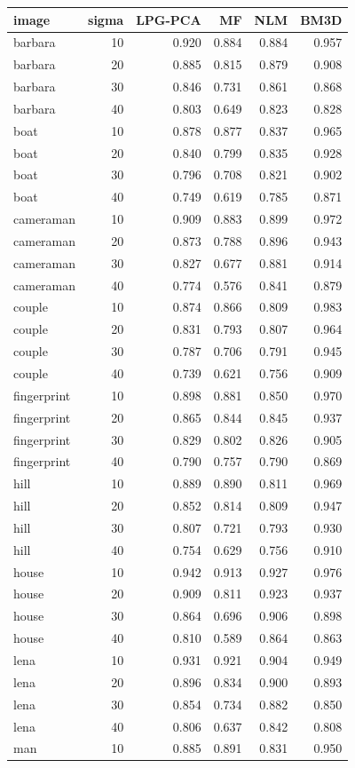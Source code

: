\begin{tabular}{lrrrrr}
\toprule
image&sigma&LPG-PCA&MF&NLM&BM3D\\
\midrule
barbara&10&0.920&0.884&0.884&0.957\\
barbara&20&0.885&0.815&0.879&0.908\\
barbara&30&0.846&0.731&0.861&0.868\\
barbara&40&0.803&0.649&0.823&0.828\\
boat&10&0.878&0.877&0.837&0.965\\
boat&20&0.840&0.799&0.835&0.928\\
boat&30&0.796&0.708&0.821&0.902\\
boat&40&0.749&0.619&0.785&0.871\\
cameraman&10&0.909&0.883&0.899&0.972\\
cameraman&20&0.873&0.788&0.896&0.943\\
cameraman&30&0.827&0.677&0.881&0.914\\
cameraman&40&0.774&0.576&0.841&0.879\\
couple&10&0.874&0.866&0.809&0.983\\
couple&20&0.831&0.793&0.807&0.964\\
couple&30&0.787&0.706&0.791&0.945\\
couple&40&0.739&0.621&0.756&0.909\\
fingerprint&10&0.898&0.881&0.850&0.970\\
fingerprint&20&0.865&0.844&0.845&0.937\\
fingerprint&30&0.829&0.802&0.826&0.905\\
fingerprint&40&0.790&0.757&0.790&0.869\\
hill&10&0.889&0.890&0.811&0.969\\
hill&20&0.852&0.814&0.809&0.947\\
hill&30&0.807&0.721&0.793&0.930\\
hill&40&0.754&0.629&0.756&0.910\\
house&10&0.942&0.913&0.927&0.976\\
house&20&0.909&0.811&0.923&0.937\\
house&30&0.864&0.696&0.906&0.898\\
house&40&0.810&0.589&0.864&0.863\\
lena&10&0.931&0.921&0.904&0.949\\
lena&20&0.896&0.834&0.900&0.893\\
lena&30&0.854&0.734&0.882&0.850\\
lena&40&0.806&0.637&0.842&0.808\\
man&10&0.885&0.891&0.831&0.950\\

\end{tabular}
